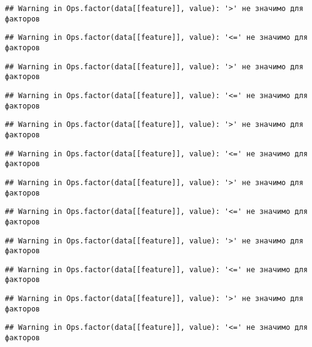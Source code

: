 \documentclass[
]{article}
\begin{document}
\begin{verbatim}
## Warning in Ops.factor(data[[feature]], value): '>' не значимо для факторов
\end{verbatim}

\begin{verbatim}
## Warning in Ops.factor(data[[feature]], value): '<=' не значимо для факторов
\end{verbatim}

\begin{verbatim}
## Warning in Ops.factor(data[[feature]], value): '>' не значимо для факторов
\end{verbatim}

\begin{verbatim}
## Warning in Ops.factor(data[[feature]], value): '<=' не значимо для факторов
\end{verbatim}

\begin{verbatim}
## Warning in Ops.factor(data[[feature]], value): '>' не значимо для факторов
\end{verbatim}

\begin{verbatim}
## Warning in Ops.factor(data[[feature]], value): '<=' не значимо для факторов
\end{verbatim}

\begin{verbatim}
## Warning in Ops.factor(data[[feature]], value): '>' не значимо для факторов
\end{verbatim}

\begin{verbatim}
## Warning in Ops.factor(data[[feature]], value): '<=' не значимо для факторов
\end{verbatim}

\begin{verbatim}
## Warning in Ops.factor(data[[feature]], value): '>' не значимо для факторов
\end{verbatim}

\begin{verbatim}
## Warning in Ops.factor(data[[feature]], value): '<=' не значимо для факторов
\end{verbatim}

\begin{verbatim}
## Warning in Ops.factor(data[[feature]], value): '>' не значимо для факторов
\end{verbatim}

\begin{verbatim}
## Warning in Ops.factor(data[[feature]], value): '<=' не значимо для факторов
\end{verbatim}
\end{document}
